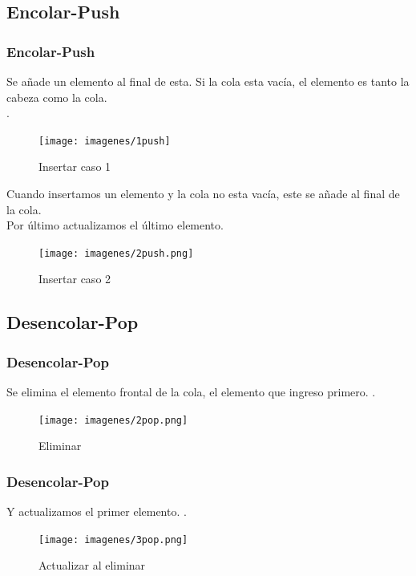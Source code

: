 \documentclass{beamer}
\begin{document}
 \subsection{Encolar-Push}
    \begin{frame}
      \frametitle{Encolar-Push}
      Se añade un elemento al final de esta. Si la cola esta vacía, el elemento es tanto la cabeza como la cola.\\
      .\\
      
      \begin{figure}
    \texttt{[image: imagenes/1push]}
    \caption{Insertar caso 1}
    \end{figure}
    \end{frame}
    
    \begin{frame}
	Cuando insertamos un elemento y la cola no esta vacía, este se añade al final de la cola.\\
	Por último actualizamos el último elemento.\\
    
    \begin{figure}
	\texttt{[image: imagenes/2push.png]}
      \caption{Insertar caso 2}
      \end{figure}
   
   \end{frame}
    
\subsection{Desencolar-Pop}
    \begin{frame}
      \frametitle{Desencolar-Pop}
      Se elimina el elemento frontal de la cola, el elemento que ingreso primero. 
      .\\
      
      \begin{figure}
	\texttt{[image: imagenes/2pop.png]}
      \caption{Eliminar}
      \end{figure}
      
    \end{frame}
    \begin{frame}
      \frametitle{Desencolar-Pop}
      Y actualizamos el primer elemento.
      .\\
      \begin{figure}
	\texttt{[image: imagenes/3pop.png]}
	\caption{Actualizar al eliminar}
      \end{figure}
    \end{frame}
    
\end{document}
